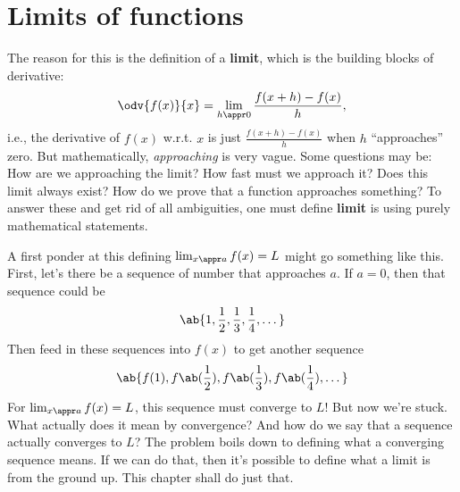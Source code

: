 \chapter{Limits of functions}

The reason for this is the definition of a \textbf{limit}, which is the building blocks of derivative:
\begin{equation}
  \odv{f(x)}{x} = \lim_{h \appr 0}\frac{f(x + h) - f(x)}{h},
\end{equation}
i.e., the derivative of $f(x)$ w.r.t. $x$ is just $\frac{f(x + h) - f(x)}{h}$ when $h$ \enquote{approaches} zero. But mathematically, \emph{approaching} is very vague. Some questions may be: How are we approaching the limit? How fast must we approach it? Does this limit always exist? How do we prove that a function approaches something? To answer these and get rid of all ambiguities, one must define \textbf{limit} is using purely mathematical statements.

A first ponder at this defining $\lim_{x \appr a}f(x) = L$ might go something like this. First, let's there be a sequence of number that approaches $a$. If $a = 0$, then that sequence could be
\begin{equation*}
  \ab\{1, \frac{1}{2}, \frac{1}{3}, \frac{1}{4}, \dots\}
\end{equation*}
Then feed in these sequences into $f(x)$ to get another sequence
\begin{equation*}
  \ab\{f(1), f\ab(\frac{1}{2}), f\ab(\frac{1}{3}), f\ab(\frac{1}{4}), \dots\}
\end{equation*}
For $\lim_{x \appr a}f(x) = L$, this sequence must converge to $L$! But now we're stuck. What actually does it mean by convergence? And how do we say that a sequence actually converges to $L$? The problem boils down to defining what a converging sequence means. If we can do that, then it's possible to define what a limit is from the ground up. This chapter shall do just that.
